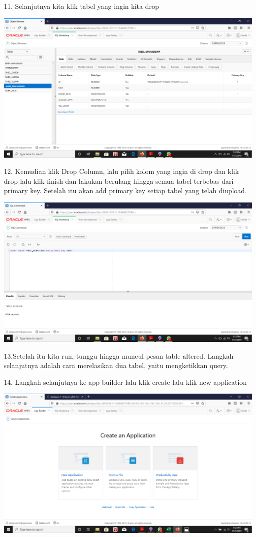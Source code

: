 \documentclass{article}
\begin{document}
\item 11. Selanjutnya kita klik tabel yang ingin kita drop
\begin{center}
 \includegraphics[width=10cm\textwidth]{gambar/11.png}
\end{center}
\newpage
\item 12. Kemudian klik Drop Column, lalu pilih kolom yang ingin di drop dan  klik drop lalu klik finish dan lakukan berulang hingga semua tabel terbebas dari primary key. Setelah itu akan add primary key setiap tabel yang telah diupload.
\begin{center}
 \includegraphics[width=10cm\textwidth]{gambar/12.png}
\end{center}
\item 13.Setelah itu kita run, tunggu hingga muncul pesan table altered. Langkah selanjutnya adalah cara merelasikan dua tabel, yaitu  mengketikkan query.
\item 14. Langkah selanjutnya ke app builder lalu klik create lalu klik new application
\begin{center}
    \includegraphics[width=10cm\textwidth]{gambar/15.png}
\end{center}
\end{document}
